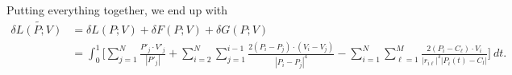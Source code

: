 Putting everything together, we end up with 
\begin{align*}
    \delta \tilde{L(P; V)} &= \delta L(P;V) +  \delta F(P;V) + \delta  G(P;V) \\
                           &= \int_{0}^{1} \bigg[ \sum_{j=1}^{N} \frac{P'_j \cdot V'_j}{|P'_j|} +\sum_{i=2}^{N} \sum_{j=1}^{i-1} \frac{2(P_i - P_j) \cdot (V_i - V_j)}{| P_i - P_j|^4} 
               - \sum_{i=1}^{N}\sum_{\ell=1}^{M} \frac{2(P_i - C_{\ell}) \cdot V_i}{\big| r_{i\ell}\big|^3\big|P_i(t) - C_l \big| } \bigg] \ dt.
\end{align*}



